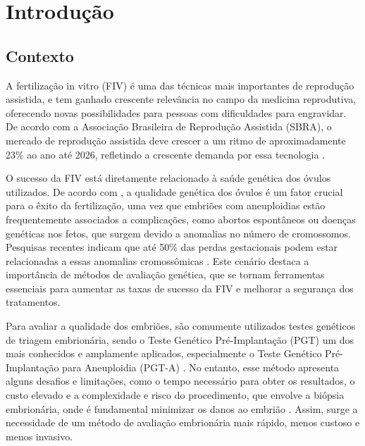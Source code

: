 \chapter[Introdução]{Introdução}

\section{Contexto}

A fertilização in vitro (FIV) é uma das técnicas mais importantes de reprodução assistida, e tem ganhado crescente relevância no campo da medicina reprodutiva, oferecendo novas possibilidades para pessoas com dificuldades para engravidar. De acordo com a Associação Brasileira de Reprodução Assistida (SBRA), o mercado de reprodução assistida deve crescer a um ritmo de aproximadamente 23\% ao ano até 2026, refletindo a crescente demanda por essa tecnologia \cite{sbra2024}.

O sucesso da FIV está diretamente relacionado à saúde genética dos óvulos utilizados. De acordo com , a qualidade genética dos óvulos é um fator crucial para o êxito da fertilização, uma vez que embriões com aneuploidias estão frequentemente associados a complicações, como abortos espontâneos ou doenças genéticas nos fetos, que surgem devido a anomalias no número de cromossomos. Pesquisas recentes indicam que até 50\% das perdas gestacionais podem estar relacionadas a essas anomalias cromossômicas \cite{scienceofbiogenetics2024}. Este cenário destaca a importância de métodos de avaliação genética, que se tornam ferramentas essenciais para aumentar as taxas de sucesso da FIV e melhorar a segurança dos tratamentos.

Para avaliar a qualidade dos embriões, são comumente utilizados testes genéticos de triagem embrionária, sendo o Teste Genético Pré-Implantação (PGT) um dos mais conhecidos e amplamente aplicados, especialmente o Teste Genético Pré-Implantação para Aneuploidia (PGT-A) \cite{yang2024}. No entanto, esse método apresenta alguns desafios e limitações, como o tempo necessário para obter os resultados, o custo elevado e a complexidade e risco do procedimento, que envolve a biópsia embrionária, onde é fundamental minimizar os danos ao embrião \cite{yang2024}. Assim, surge a necessidade de um método de avaliação embrionária mais rápido, menos custoso e menos invasivo.

